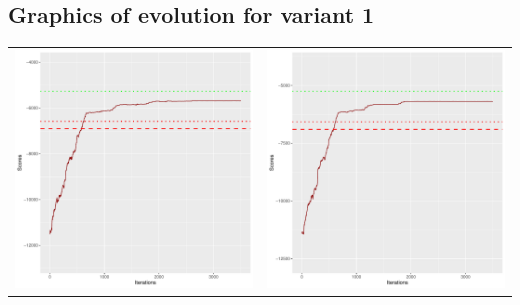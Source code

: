 \documentclass[]{scrartcl}
\begin{document}
\subsection{Graphics of evolution for variant 1}

\begin{table}[h!]
\begin{tabular}{cc}
\includegraphics[scale = 0.4]{./figs/alarm/v1/30/boundsEvolution-3502.pdf} & 
\includegraphics[scale = 0.4]{./figs/alarm/v1/50/boundsEvolution-3502.pdf} \\

\end{tabular}
\end{table}
\end{document}
